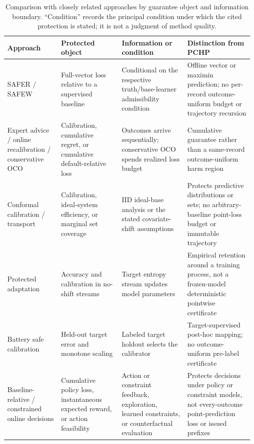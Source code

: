 \documentclass[preprint,12pt]{elsarticle}
\begin{document}
\begin{table}[H]
  \centering
  \caption{Comparison with closely related approaches by guarantee object and information boundary. ``Condition'' records the principal condition under which the cited protection is stated; it is not a judgment of method quality.}
  \label{tab:novelty_audit}
  \scriptsize
  \renewcommand{\arraystretch}{0.84}
  \begin{tabularx}{\textwidth}{@{}>{\raggedright\arraybackslash}p{}>{\raggedright\arraybackslash}p{}>{\raggedright\arraybackslash}p{}>{\raggedright\arraybackslash}X@{}}
    \toprule
    Approach & Protected object & Information or condition & Distinction from PCHP \\
    \midrule
    SAFER / SAFEW \citep{li2017safer,li2021safeweak} & Full-vector loss relative to a supervised baseline & Conditional on the respective truth/base-learner admissibility condition & Offline vector or maximin prediction; no per-record outcome-uniform budget or trajectory recursion \\
    Expert advice / online recalibration / conservative OCO \citep{chernov2009evaluators,marx2025calibrated,deshpande2025calibrated,bernasconi2021conservative} & Calibration, cumulative regret, or cumulative default-relative loss & Outcomes arrive sequentially; conservative OCO spends realized loss budget & Cumulative guarantee rather than a same-record outcome-uniform harm region \\
    Conformal calibration / transport \citep{vovk2020conformal,tuwani2023transport,filgueira2026conformalized} & Calibration, ideal-system efficiency, or marginal set coverage & IID ideal-base analysis or the stated covariate-shift assumptions & Protects predictive distributions or sets; no arbitrary-baseline point-loss budget or immutable trajectory \\
    Protected adaptation \citep{bar2024protected} & Accuracy and calibration in no-shift streams & Target entropy stream updates model parameters & Empirical retention around a training process, not a frozen-model deterministic pointwise certificate \\
    Battery safe calibration \citep{nyachionjeka2026safecalibrated} & Held-out target error and monotone scaling & Labeled target holdout selects the calibrator & Target-supervised post-hoc mapping; no outcome-uniform pre-label certificate \\
    Baseline-relative / constrained online decisions \citep{moradipari2020stagewise,deb2025conservative,sridharan2025unknown,vaskov2024donoharm} & Cumulative policy loss, instantaneous expected reward, or action feasibility & Action or constraint feedback, exploration, learned constraints, or counterfactual evaluation & Protects decisions under policy or constraint models, not every-outcome point-prediction loss or issued prefixes \\

\end{tabularx}
\end{table}
\end{document}
